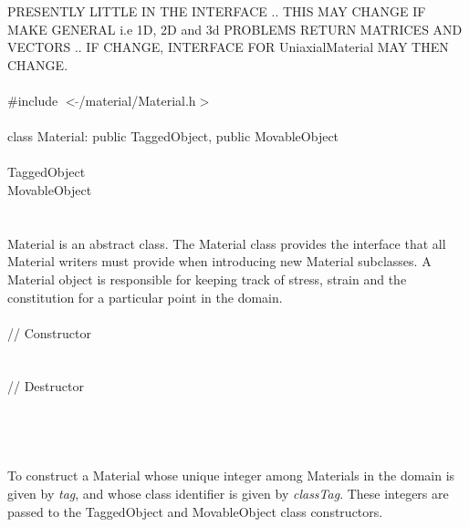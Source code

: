 
PRESENTLY LITTLE IN THE INTERFACE .. THIS MAY CHANGE IF MAKE GENERAL
i.e 1D, 2D and 3d PROBLEMS RETURN MATRICES AND VECTORS .. IF CHANGE,
INTERFACE FOR UniaxialMaterial MAY THEN CHANGE. \\ 

   \\
\indent \#include $<\tilde{ }$/material/Material.h$>$  \\

  \\
\indent class Material: public TaggedObject, public MovableObject \\

 \\
\indent TaggedObject \\
\indent MovableObject \\
\indent{} \\

  \\
\indent Material is an abstract class. The Material class
provides the interface that all Material writers must provide
when introducing new Material subclasses. A Material object
is responsible for keeping track of stress, strain and the
constitution for a particular point in the domain. \\ 

 \\
\indent // Constructor \\
  \\ \\
\indent // Destructor \\
\\ \\

  \\
  \\
To construct a Material whose unique integer among Materials in the
domain is given by {\em tag}, and whose class identifier is given
by {\em classTag}. These integers are passed to the TaggedObject and
MovableObject class constructors. \\

 \\
\\ 



